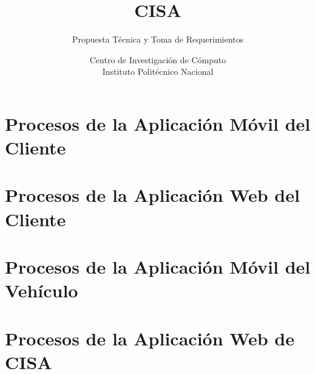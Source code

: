 \documentclass[10pt]{report}
\title{CISA}
\author{Centro de Investigación de Cómputo\\Instituto Politécnico Nacional}
\subtitle{Propuesta Técnica y Toma de Requerimientos}
\date{}
\begin{document}
\maketitle
{}
\tableofcontents



\chapter{Procesos de la Aplicación Móvil del Cliente}
\label{ch:Uno}


\chapter{Procesos de la Aplicación Web del Cliente}
\label{ch:Dos}


\chapter{Procesos de la Aplicación Móvil del Vehículo}
\label{ch:Tres}


\chapter{Procesos de la Aplicación Web de CISA}
\label{ch:Tres}

\end{document}
